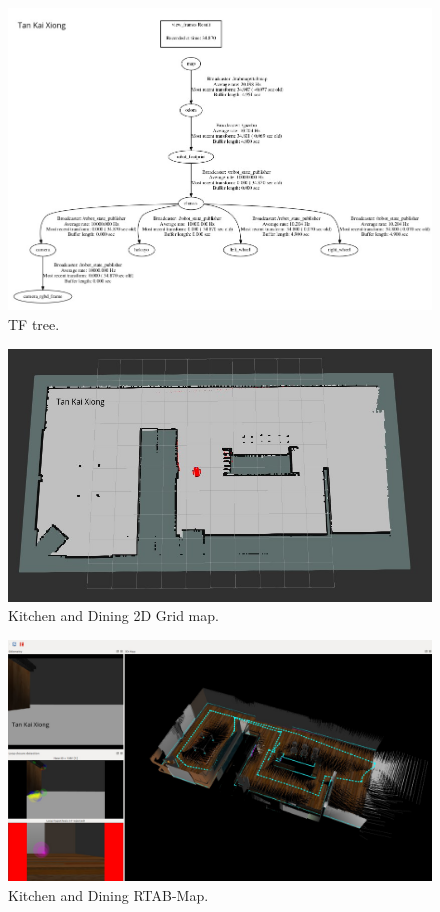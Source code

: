 \documentclass[10pt,journal,compsoc]{IEEEtran}
\begin{document}
\begin{figure}[thpb]
      \centering
      \includegraphics[width=\linewidth]{tf.png}
      \caption{TF tree.}
      \label{fig:robot4}
\end{figure}

\begin{figure}[thpb]
      \centering
      \includegraphics[width=\linewidth]{kitchen_2d_map.png}
      \caption{Kitchen and Dining 2D Grid map.}
      \label{fig:robot5}
\end{figure}

\begin{figure}[thpb]
      \centering
      \includegraphics[width=\linewidth]{kitchen_rtabmap.png}
      \caption{Kitchen and Dining RTAB-Map.}
      \label{fig:robot6}
\end{figure}
\end{document}
